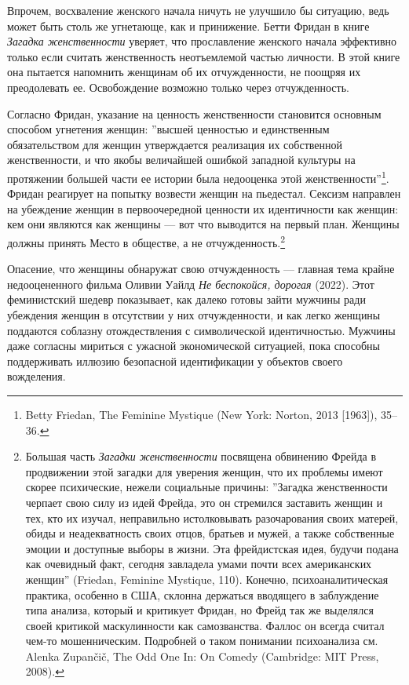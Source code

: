\documentclass[12pt]{book}
\begin{document}
Впрочем, восхваление женского начала ничуть не улучшило бы ситуацию, ведь может быть столь же угнетающе, как и принижение. Бетти Фридан в книге \textit{Загадка женственности} уверяет, что прославление женского начала эффективно только если считать женственность неотъемлемой частью личности. В этой книге она пытается напомнить женщинам об их отчужденности, не поощряя их преодолевать ее. Освобождение возможно только через отчужденность.

Согласно Фридан, указание на ценность женственности становится основным способом угнетения женщин: ''высшей ценностью и единственным обязательством для женщин утверждается реализация их собственной женственности, и что якобы величайшей ошибкой западной культуры на протяжении большей части ее истории была недооценка этой женственности''\footnote{Betty Friedan, The Feminine Mystique (New York: Norton, 2013 [1963]), 35–36.}. Фридан реагирует на попытку возвести женщин на пьедестал. Сексизм направлен на убеждение женщин в первоочередной ценности их идентичности как женщин: кем они являются как женщины --- вот что выводится на первый план. Женщины должны принять Место в обществе, а не отчужденность.\footnote{Большая часть \textit{Загадки женственности} посвящена обвинению Фрейда в продвижении этой загадки для уверения женщин, что их проблемы имеют скорее психические, нежели социальные причины: ''Загадка женственности черпает свою силу из идей Фрейда, это он стремился заставить женщин и тех, кто их изучал, неправильно истолковывать разочарования своих матерей, обиды и неадекватность своих отцов, братьев и мужей, а также собственные эмоции и доступные выборы в жизни. Эта фрейдистская идея, будучи подана как очевидный факт, сегодня завладела умами почти всех американских женщин'' (Friedan, Feminine Mystique, 110). Конечно, психоаналитическая практика, особенно в США, склонна держаться вводящего в заблуждение типа анализа, который и критикует Фридан, но Фрейд так же выделялся своей критикой маскулинности как самозванства. Фаллос он всегда считал чем-то мошенническим. Подробней о таком понимании психоанализа см. Alenka Zupančič, The Odd One In: On Comedy (Cambridge: MIT Press, 2008).}

Опасение, что женщины обнаружат свою отчужденность --- главная тема крайне недооцененного фильма Оливии Уайлд \textit{Не беспокойся, дорогая} (2022). Этот феминистский шедевр показывает, как далеко готовы зайти мужчины ради убеждения женщин в отсутствии у них отчужденности, и как легко женщины поддаются соблазну отождествления с символической идентичностью. Мужчины даже согласны мириться с ужасной экономической ситуацией, пока способны поддерживать иллюзию безопасной идентификации у объектов своего вожделения.
\end{document}
